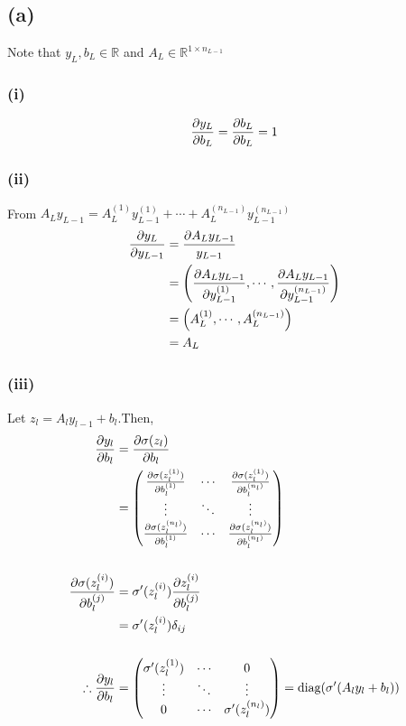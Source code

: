 \documentclass[10pt]{article}
\begin{document}
\section{}
\subsection*{(a)}
Note that $y_L,b_L\in \mathbb{R}$ and $A_L \in \mathbb{R}^{1\times n_{L-1}}$
\subsubsection*{(i)}
\begin{equation*}
    {\partial y_L \over \partial b_L}  = {\partial b_L \over \partial b_L} = 1
\end{equation*}
\subsubsection*{(ii)}
From $A_Ly_{L-1} = A_L^{(1)}y_{L-1}^{(1)} + \cdots + A_L^{(n_{L-1})}y_{L-1}^{(n_{L-1})}$
\begin{align*}
    {\partial y_L \over \partial y_{L-1}} &= {\partial A_L y_{L-1} \over y_{L-1}} \\
    &= \left({\partial A_Ly_{L-1} \over \partial y_{L-1}^{(1)}}, \cdots, {\partial A_Ly_{L-1} \over \partial y_{L-1}^{(n_{L-1})}}\right) \\
    &= \left(A_L^{(1)},\cdots, A_L^{(n_{L-1})}\right)\\
    &= A_L
\end{align*}
\subsubsection*{(iii)}
Let $z_l = A_l y_{l-1} + b_l$.Then,
\begin{align*}
    {\partial y_l \over \partial b_l} &= {\partial \sigma(z_l) \over \partial b_l} \\
    &= \begin{pmatrix}
        {\partial \sigma(z_l^{(1)}) \over \partial b_l^{(1)}} & \cdots & {\partial \sigma(z_l^{(1)}) \over \partial b_l^{(n_l)}}\\
        \vdots & \ddots & \vdots \\
        {\partial \sigma(z_l^{(n_l)}) \over \partial b_l^{(1)}} & \cdots & {\partial \sigma(z_l^{(n_l)}) \over \partial b_l^{(n_l)}}
    \end{pmatrix}\\ \\
    {\partial \sigma(z_l^{(i)}) \over \partial b_l^{(j)}} &= \sigma^\prime(z_l^{(i)}) {\partial z_l^{(i)} \over \partial b_l^{(j)}} \\
    &= \sigma^\prime(z_l^{(i)}) \delta_{ij}\\ \\
    \therefore {\partial y_l \over \partial b_l} &= \begin{pmatrix}
        \sigma^\prime(z_l^{(1)}) & \cdots & 0 \\
        \vdots & \ddots & \vdots \\
        0 & \cdots & \sigma^\prime(z_l^{(n_l)})
    \end{pmatrix} = \text{diag}(\sigma^{\prime}(A_ly_l + b_l))
\end{align*}
\end{document}
